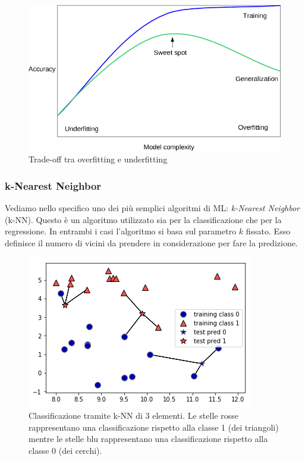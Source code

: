 \documentclass[12pt,italian]{report}
\begin{document}
\begin{figure} [h!]


	\includegraphics[scale=0.5]{../img/tradeoff_overfitting_underfitting.png}
	\caption{Trade-off tra overfitting e underfitting}
	\label{fig:tradeoff_img}
\end{figure}


\subsubsection{k-Nearest Neighbor}

Vediamo nello specifico uno dei più semplici algoritmi di ML: \emph{k-Nearest Neighbor} (k-NN). Questo è un algoritmo utilizzato sia per la classificazione che per la regressione. In entrambi i casi l'algoritmo si basa sul parametro $k$ fissato. Esso definisce il numero di vicini da prendere in considerazione per fare la predizione.


\begin{figure}[h!]
	\center
	\includegraphics[scale=0.7]{../img/knn_classifier}
	\caption{Classificazione tramite k-NN di 3 elementi. Le stelle rosse rappresentano una classificazione rispetto alla classe 1 (dei triangoli) mentre le stelle blu rappresentano una classificazione rispetto alla classe 0 (dei cerchi).}
	\label{fig:knn_classifier}
\end{figure}
\end{document}
